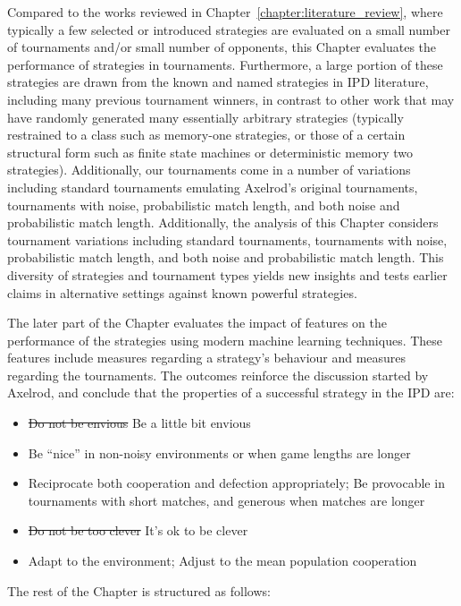 Compared to the works reviewed in Chapter~\ref{chapter:literature_review}, where
typically a few selected or introduced strategies are evaluated on a small
number of tournaments and/or small number of opponents, this Chapter evaluates
the performance of \numberofstrategies strategies in \numberofalltournaments
tournaments. Furthermore, a large portion of these strategies are drawn from the
known and named strategies in IPD literature, including many previous tournament
winners, in contrast to other work that may have randomly generated many
essentially arbitrary strategies (typically restrained to a class such as
memory-one strategies, or those of a certain structural form such as finite
state machines or deterministic memory two strategies). Additionally, our
tournaments come in a number of variations including standard tournaments
emulating Axelrod's original tournaments, tournaments with noise, probabilistic
match length, and both noise and probabilistic match length. Additionally, the
analysis of this Chapter considers tournament variations including standard
tournaments, tournaments with noise, probabilistic match length, and both noise
and probabilistic match length. This diversity of strategies and tournament
types yields new insights and tests earlier claims in alternative settings
against known powerful strategies.

The later part of the Chapter evaluates the impact of features on the
performance of the strategies using modern machine learning techniques. These
features include measures regarding a strategy's behaviour and measures
regarding the tournaments. The outcomes reinforce the discussion started by
Axelrod, and conclude that the properties of a successful strategy in the IPD
are:

\begin{itemize}
    \item \st{Do not be envious} Be a little bit envious
    \item Be ``nice'' in non-noisy environments or when game lengths are longer
    \item Reciprocate both cooperation and defection appropriately;
    Be provocable in tournaments with short matches, and generous when matches are longer
    \item \st{Do not be too clever} It's ok to be clever
    \item Adapt to the environment; Adjust to the mean population cooperation
\end{itemize}

The rest of the Chapter is structured as follows:

